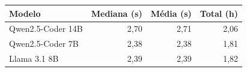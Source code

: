 \begin{tabular}{lrrr}
\hline
Modelo & Mediana (s) & Média (s) & Total (h) \\
\hline
Qwen2.5-Coder 14B & 2,70 & 2,71 & 2,06 \\
Qwen2.5-Coder 7B & 2,38 & 2,38 & 1,81 \\
Llama 3.1 8B & 2,39 & 2,39 & 1,82 \\
\hline
\end{tabular}
